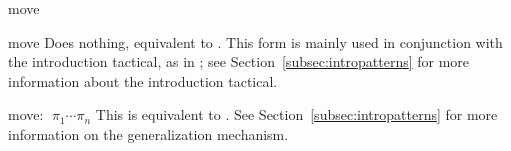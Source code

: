 \begin{tactic}{move}
  \begin{tsyntax}{move}
     Does nothing, equivalent to . This form is mainly
     used in conjunction with the introduction tactical, as in
     ; see
     Section~\ref{subsec:intropatterns}
     for more information about the introduction tactical.
  \end{tsyntax}

  \begin{tsyntax}{move: $\;\pi_1 \cdots \pi_n$}
    This is equivalent to .
    See Section~\ref{subsec:intropatterns} for more
    information on the generalization mechanism.
  \end{tsyntax}
\end{tactic}

